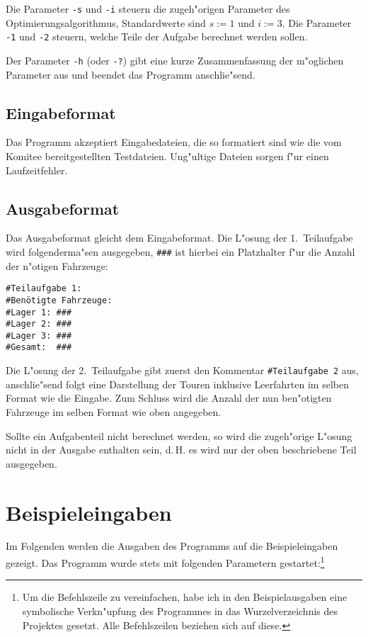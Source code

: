 \documentclass{scrreprt}
\begin{document}
Die Parameter \texttt{-s} und \texttt{-i} steuern die zugeh"origen Parameter des
Optimierungsalgorithmus, Standardwerte sind $s := 1$ und $i := 3$. Die Parameter
\texttt{-1} und \texttt{-2} steuern, welche Teile der Aufgabe berechnet werden
sollen.

Der Parameter \texttt{-h} (oder {\texttt{-?}}) gibt eine kurze Zusammenfassung
der m"oglichen Parameter aus und beendet das Programm anschlie"send.

\section{Eingabeformat}
Das Programm akzeptiert Eingabedateien, die so formatiert sind wie die vom
Komitee bereitgestellten Testdateien.  Ung"ultige Dateien sorgen f"ur einen
Laufzeitfehler.

\section{Ausgabeformat}
Das Ausgabeformat gleicht dem Eingabeformat.  Die L"osung der 1.\ Teilaufgabe
wird folgenderma"sen ausgegeben, \texttt{\#\#\#} ist hierbei ein Platzhalter
f"ur die Anzahl der n"otigen Fahrzeuge:

\begin{verbatim}
#Teilaufgabe 1:
#Benötigte Fahrzeuge:
#Lager 1: ###
#Lager 2: ###
#Lager 3: ###
#Gesamt:  ###
\end{verbatim}

Die L"osung der 2.\ Teilaufgabe gibt zuerst den Kommentar \texttt{\#Teilaufgabe\ 
2} aus, anschlie"send folgt eine Darstellung der Touren inklusive Leerfahrten
im selben Format wie die Eingabe.  Zum Schluss wird die Anzahl der nun
ben"otigten Fahrzeuge im selben Format wie oben angegeben.

Sollte ein Aufgabenteil nicht berechnet werden, so wird die zugeh"orige L"osung
nicht in der Ausgabe enthalten sein, d.\,H. es wird nur der oben beschriebene
Teil ausgegeben.

\chapter{Beispieleingaben}
Im Folgenden werden die Ausgaben des Programms auf die Beispieleingaben gezeigt.
Das Programm wurde stets mit folgenden Parametern gestartet:\footnote{Um die
Befehlszeile zu vereinfachen, habe ich in den Beispielausgaben eine symbolische
Verkn"upfung des Programmes in das Wurzelverzeichnis des Projektes gesetzt. Alle
Befehlszeilen beziehen sich auf diese.}
\end{document}
